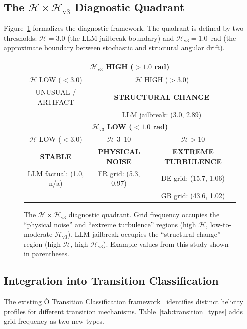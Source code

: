 \documentclass[11pt,a4paper]{article}
\begin{document}
\subsection{The $\mathcal{H} \times \mathcal{H}_{\text{v3}}$ Diagnostic Quadrant}

Figure~\ref{fig:quadrant} formalizes the diagnostic framework. The quadrant is defined by two thresholds: $\mathcal{H} = 3.0$ (the LLM jailbreak boundary) and $\mathcal{H}_{\text{v3}} = 1.0$~rad (the approximate boundary between stochastic and structural angular drift).

\begin{figure}[H]
\centering
\begin{tabular}{|c|c|c|}
\hline
\multicolumn{3}{|c|}{\textbf{$\mathcal{H}_{\text{v3}}$ HIGH ($> 1.0$ rad)}} \\
\hline
$\mathcal{H}$ LOW ($< 3.0$) & \multicolumn{2}{c|}{$\mathcal{H}$ HIGH ($> 3.0$)} \\
UNUSUAL / ARTIFACT & \multicolumn{2}{c|}{\textbf{STRUCTURAL CHANGE}} \\
& \multicolumn{2}{c|}{LLM jailbreak: (3.0, 2.89)} \\
\hline
\multicolumn{3}{|c|}{\textbf{$\mathcal{H}_{\text{v3}}$ LOW ($< 1.0$ rad)}} \\
\hline
$\mathcal{H}$ LOW ($< 3.0$) & $\mathcal{H}$ 3--10 & $\mathcal{H} > 10$ \\
\textbf{STABLE} & \textbf{PHYSICAL NOISE} & \textbf{EXTREME TURBULENCE} \\
LLM factual: (1.0, n/a) & FR grid: (5.3, 0.97) & DE grid: (15.7, 1.06) \\
& & GB grid: (43.6, 1.02) \\
\hline
\end{tabular}
\caption{The $\mathcal{H} \times \mathcal{H}_{\text{v3}}$ diagnostic quadrant. Grid frequency occupies the ``physical noise'' and ``extreme turbulence'' regions (high $\mathcal{H}$, low-to-moderate $\mathcal{H}_{\text{v3}}$). LLM jailbreak occupies the ``structural change'' region (high $\mathcal{H}$, high $\mathcal{H}_{\text{v3}}$). Example values from this study shown in parentheses.}
\label{fig:quadrant}
\end{figure}

\subsection{Integration into Transition Classification}

The existing Ô Transition Classification framework~\cite{transition_classification} identifies distinct helicity profiles for different transition mechanisms. Table~\ref{tab:transition_types} adds grid frequency as two new types.
\end{document}
